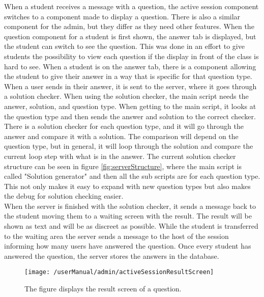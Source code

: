 \noindent
When a student receives a message with a question, the active session component switches to a component made to display a question. There is also a similar component for the admin, but they differ as they need other features. When the question component for a student is first shown, the answer tab is displayed, but the student can switch to see the question. This was done in an effort to give students the possibility to view each question if the display in front of the class is hard to see. When a student is on the answer tab, there is a component allowing the student to give their answer in a way that is specific for that question type.
\\[11pt]
When a user sends in their answer, it is sent to the server, where it goes through a solution checker. When using the solution checker, the main script needs the answer, solution, and question type. When getting to the main script, it looks at the question type and then sends the answer and solution to the correct checker. There is a solution checker for each question type, and it will go through the answer and compare it with a solution. The comparison will depend on the question type, but in general, it will loop through the solution and compare the current loop step with what is in the answer. The current solution checker structure can be seen in figure \ref{fig:serverStructure}, where the main script is called "Solution generator" and then all the sub scripts are for each question type. This not only makes it easy to expand with new question types but also makes the debug for solution checking easier.
\\[11pt]
When the server is finished with the solution checker, it sends a message back to the student moving them to a waiting screen with the result. The result will be shown as text and will be as discreet as possible. While the student is transferred to the waiting area the server sends a message to the host of the session informing how many users have answered the question. Once every student has answered the question, the server stores the answers in the database.

\begin{figure}
	\centering
	\texttt{[image: /userManual/admin/activeSessionResultScreen]}
	\caption{The figure displays the result screen of a question.}
	\label{fig:resultScreen}
\end{figure}

